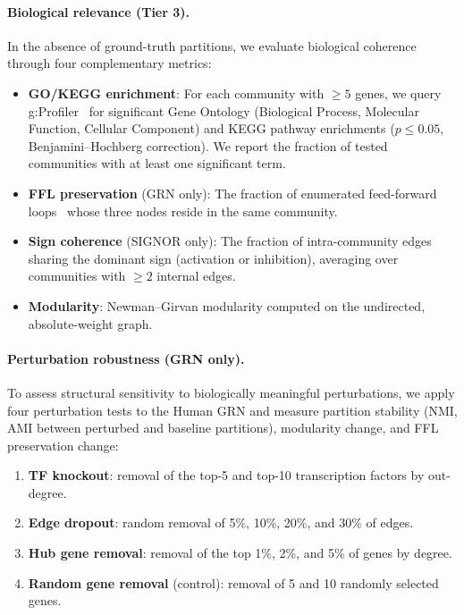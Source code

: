 \documentclass[11pt]{article}
\begin{document}
\paragraph{Biological relevance (Tier 3).}
In the absence of ground-truth partitions, we evaluate biological coherence through four complementary metrics:
\begin{itemize}[leftmargin=*,nosep]
  \item \textbf{GO/KEGG enrichment}: For each community with $\geq 5$ genes, we query g:Profiler~\citep{gprofiler_2019} for significant Gene Ontology (Biological Process, Molecular Function, Cellular Component) and KEGG pathway enrichments ($p \leq 0.05$, Benjamini--Hochberg correction). We report the fraction of tested communities with at least one significant term.
  \item \textbf{FFL preservation} (GRN only): The fraction of enumerated feed-forward loops~\citep{shen_orr_ffl_2002, milo_motifs_2002} whose three nodes reside in the same community.
  \item \textbf{Sign coherence} (SIGNOR only): The fraction of intra-community edges sharing the dominant sign (activation or inhibition), averaging over communities with $\geq 2$ internal edges.
  \item \textbf{Modularity}: Newman--Girvan modularity computed on the undirected, absolute-weight graph.
\end{itemize}

\paragraph{Perturbation robustness (GRN only).}
To assess structural sensitivity to biologically meaningful perturbations, we apply four perturbation tests to the Human GRN and measure partition stability (NMI, AMI between perturbed and baseline partitions), modularity change, and FFL preservation change:
\begin{enumerate}[leftmargin=*,nosep]
  \item \textbf{TF knockout}: removal of the top-5 and top-10 transcription factors by out-degree.
  \item \textbf{Edge dropout}: random removal of 5\%, 10\%, 20\%, and 30\% of edges.
  \item \textbf{Hub gene removal}: removal of the top 1\%, 2\%, and 5\% of genes by degree.
  \item \textbf{Random gene removal} (control): removal of 5 and 10 randomly selected genes.
\end{enumerate}
\end{document}
